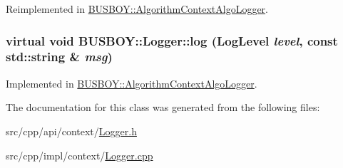 Reimplemented in \hyperlink{classBUSBOY_1_1AlgorithmContextAlgoLogger_a9ab10c3c0978fda39e71bf89abb63c32}{BUSBOY::AlgorithmContextAlgoLogger}.\hypertarget{classBUSBOY_1_1Logger_ad07e2e8263d8bfb1e702e0548e502957}{
\subsubsection[{log}]{\setlength{\rightskip}{0pt plus 5cm}virtual void BUSBOY::Logger::log ({\bf LogLevel} {\em level}, \/  const std::string \& {\em msg})}}
\label{classBUSBOY_1_1Logger_ad07e2e8263d8bfb1e702e0548e502957}


Implemented in \hyperlink{classBUSBOY_1_1AlgorithmContextAlgoLogger_aec09b54bdae94b073e215ca5bab0a081}{BUSBOY::AlgorithmContextAlgoLogger}.

The documentation for this class was generated from the following files:\begin{DoxyCompactItemize}
\item 
src/cpp/api/context/\hyperlink{Logger_8h}{Logger.h}\item 
src/cpp/impl/context/\hyperlink{Logger_8cpp}{Logger.cpp}\end{DoxyCompactItemize}
